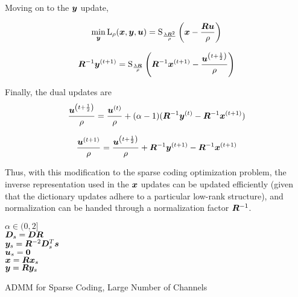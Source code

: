 Moving on to the $\bm{y}$ update,

\begin{equation}
\min_{\bm{y}} \operatorname{L}_{\rho}(\bm{x},\bm{y},\bm{u}) = \operatorname{S}_{\frac{\lambda\bm{R}^2}{\rho}}\left(\bm{x} - \frac{\bm{R}\bm{u}}{\rho}\right)
\end{equation}

\begin{equation}
\bm{R}^{-1}\bm{y}^{(t + 1)}= \operatorname{S}_{\frac{\lambda\bm{R}}{\rho}}\left(\bm{R}^{-1}\bm{x}^{(t + 1)} - \frac{\bm{u}^{\left(t + \frac{1}{2}\right)}}{\rho}\right)
\end{equation}

Finally, the dual updates are 
\begin{equation}
\frac{\bm{u}^{\left(t + \frac{1}{2}\right)}}{\rho} = \frac{\bm{u}^{(t)}}{\rho} + (\alpha - 1)(\bm{R}^{-1}\bm{y}^{(t)} - \bm{R}^{-1}\bm{x}^{(t + 1)})
\end{equation}

\begin{equation}
\frac{\bm{u}^{(t + 1)}}{\rho} = \frac{\bm{u}^{\left(t + \frac{1}{2}\right)}}{\rho} + \bm{R}^{-1}\bm{y}^{(t + 1)} - \bm{R}^{-1}\bm{x}^{(t + 1)}
\end{equation}

Thus, with this modification to the sparse coding optimization problem, the inverse representation used in the $\bm{x}$ updates can be updated efficiently (given that the dictionary updates adhere to a particular low-rank structure), and normalization can be handed through a normalization factor $\bm{R}^{-1}$.

\begin{algorithm}[H]
\SetAlgoLined
   $\alpha \in (0,2]$ \\
   $\bm{D}_s = \bm{D}\bm{R}$  \\
   $\bm{y}_s = \bm{R}^{-2}\bm{D}_s^T\bm{s}$ \\
   $\bm{u}_s = \bm{0}$ \\
  $\bm{x} = \bm{R}\bm{x}_s$ \\
  $\bm{y} = \bm{R}\bm{y}_s$
 \caption{ADMM for Sparse Coding, Large Number of Channels}
\end{algorithm}

